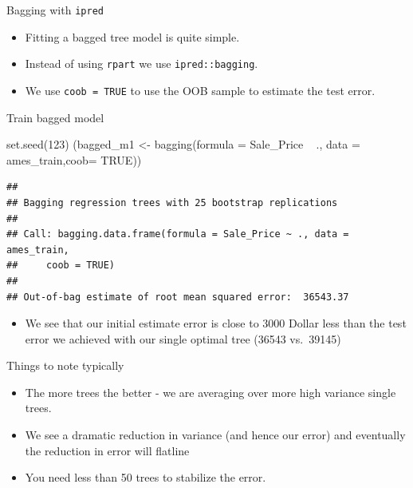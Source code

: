 \documentclass[
  10pt,
  ignorenonframetext,
]{beamer}
\newenvironment{Shaded}{}{}
\newcommand{\DataTypeTok}[1]{#1}
\newcommand{\DecValTok}[1]{#1}
\newcommand{\KeywordTok}[1]{\textcolor[rgb]{0.00,0.00,1.00}{#1}}
\newcommand{\NormalTok}[1]{#1}
\newcommand{\OperatorTok}[1]{#1}
\newcommand{\OtherTok}[1]{\textcolor[rgb]{1.00,0.25,0.00}{#1}}
\newcommand{\StringTok}[1]{\textcolor[rgb]{0.00,0.50,0.50}{#1}}
\providecommand{\tightlist}{%
  \setlength{\itemsep}{0pt}\setlength{\parskip}{0pt}}
\begin{document}
\begin{frame}[fragile]{Bagging with \texttt{ipred}}
\protect\hypertarget{bagging-with-ipred}{}

\begin{itemize}
\tightlist
\item
  Fitting a bagged tree model is quite simple.
\item
  Instead of using \texttt{rpart} we use \texttt{ipred::bagging}.
\item
  We use \texttt{coob\ =\ TRUE} to use the OOB sample to estimate the
  test error.
\end{itemize}

\end{frame}

\begin{frame}[fragile]{Train bagged model}
\protect\hypertarget{train-bagged-model}{}

\begin{Shaded}
\begin{Highlighting}[]
\KeywordTok{set.seed}\NormalTok{(}\DecValTok{123}\NormalTok{)}
\NormalTok{(bagged_m1 <-}\StringTok{ }\KeywordTok{bagging}\NormalTok{(}\DataTypeTok{formula =}\NormalTok{ Sale_Price }\OperatorTok{~}\StringTok{ }\NormalTok{.,}
  \DataTypeTok{data    =}\NormalTok{ ames_train,}\DataTypeTok{coob=} \OtherTok{TRUE}\NormalTok{))}
\end{Highlighting}
\end{Shaded}

\begin{verbatim}
## 
## Bagging regression trees with 25 bootstrap replications 
## 
## Call: bagging.data.frame(formula = Sale_Price ~ ., data = ames_train, 
##     coob = TRUE)
## 
## Out-of-bag estimate of root mean squared error:  36543.37
\end{verbatim}

\begin{itemize}
\tightlist
\item
  We see that our initial estimate error is close to 3000 Dollar less
  than the test error we achieved with our single optimal tree (36543
  vs.~39145)
\end{itemize}

\end{frame}

\begin{frame}{Things to note typically}
\protect\hypertarget{things-to-note-typically}{}

\begin{itemize}
\tightlist
\item
  The more trees the better - we are averaging over more high variance
  single trees.
\item
  We see a dramatic reduction in variance (and hence our error) and
  eventually the reduction in error will flatline 
\item
  You need less than 50 trees to stabilize the error.
\end{itemize}

\end{frame}
\end{document}
